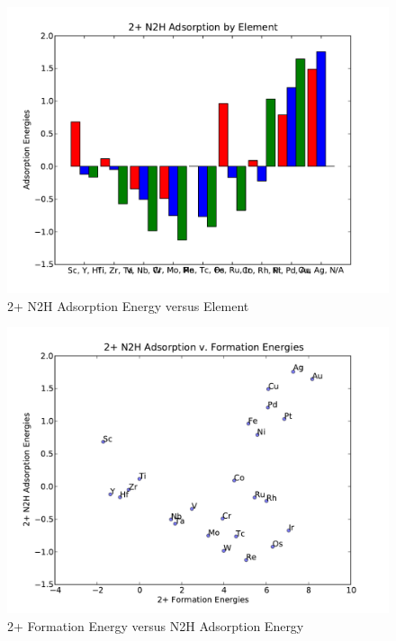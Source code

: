\documentclass[catalysts,article,submit,moreauthors,pdftex,10pt,a4paper]{mdpi}
\theoremstyle{mdpi}
\newcounter{ex}
\newcounter{re}
\theoremstyle{mdpidefinition}
\begin{document}
\begin{figure}
    \centering
    \includegraphics[width=0.8\linewidth]{Images/2+N2H_by_element.pdf}
    \caption{2+ N2H Adsorption Energy versus Element}
    \label{fig:2+_N2H_period}
\end{figure}
\begin{figure}
    \centering
    \includegraphics[width=0.8\linewidth]{Images/2+N2H_Formation.pdf}
    \caption{2+ Formation Energy versus N2H Adsorption Energy}
    \label{fig:2+_N2H_react_stab}
\end{figure}

\end{document}
